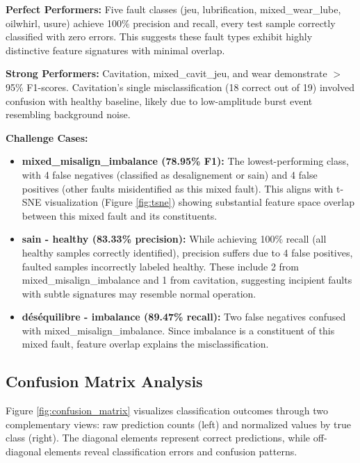 \documentclass[11pt,a4paper]{article}
\begin{document}
\textbf{Perfect Performers:} Five fault classes (jeu, lubrification, mixed\_wear\_lube, oilwhirl, usure) achieve 100\% precision and recall, every test sample correctly classified with zero errors. This suggests these fault types exhibit highly distinctive feature signatures with minimal overlap.

\textbf{Strong Performers:} Cavitation, mixed\_cavit\_jeu, and wear demonstrate  $>$ 95\% F1-scores. Cavitation's single misclassification (18 correct out of 19) involved confusion with healthy baseline, likely due to low-amplitude burst event resembling background noise.

\textbf{Challenge Cases:}
\begin{itemize}[itemsep=0.3em]
    \item \textbf{mixed\_misalign\_imbalance (78.95\% F1):} The lowest-performing class, with 4 false negatives (classified as desalignement or sain) and 4 false positives (other faults misidentified as this mixed fault). This aligns with t-SNE visualization (Figure \ref{fig:tsne}) showing substantial feature space overlap between this mixed fault and its constituents.
    
    \item \textbf{sain - healthy (83.33\% precision):} While achieving 100\% recall (all healthy samples correctly identified), precision suffers due to 4 false positives, faulted samples incorrectly labeled healthy. These include 2 from mixed\_misalign\_imbalance and 1 from cavitation, suggesting incipient faults with subtle signatures may resemble normal operation.
    
    \item \textbf{déséquilibre - imbalance (89.47\% recall):} Two false negatives confused with mixed\_misalign\_imbalance. Since imbalance is a constituent of this mixed fault, feature overlap explains the misclassification.
\end{itemize}

\subsection{Confusion Matrix Analysis}

Figure \ref{fig:confusion_matrix} visualizes classification outcomes through two complementary views: raw prediction counts (left) and normalized values by true class (right). The diagonal elements represent correct predictions, while off-diagonal elements reveal classification errors and confusion patterns.
\end{document}
